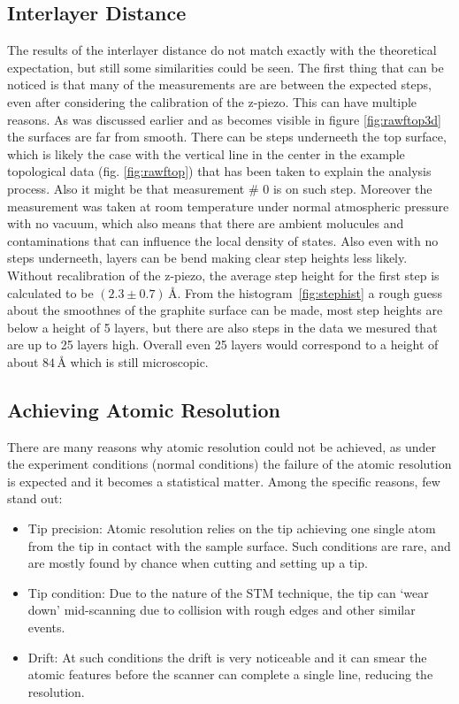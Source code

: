 \documentclass[a4paper]{article}
\begin{document}
\subsection{Interlayer Distance}

The results of the interlayer distance do not match exactly with the theoretical expectation, but still some similarities could be seen. The first thing that can be noticed is that many of the measurements are are between the expected steps, even after considering the calibration of the z-piezo. This can have multiple reasons. As was discussed earlier and as becomes visible in figure \ref{fig:rawftop3d} the surfaces are far from smooth. There can be steps underneeth the top surface, which is likely the case with the vertical line in the center in the example topological data (fig. \ref{fig:rawftop}) that has been taken to explain the analysis process. Also it might be that measurement \# 0 is on such step. Moreover the measurement was taken at room temperature under normal atmospheric pressure with no vacuum, which also means that there are ambient molucules and contaminations that can influence the local density of states. Also even with no steps underneeth, layers can be bend making clear step heights less likely.
Without recalibration of the z-piezo, the average step height for the first step is calculated to be $(2.3 \pm 0.7) \,\unit{\angstrom}$.
From the histogram~\ref{fig:stephist} a rough guess about the smoothnes of the graphite surface can be made, most step heights are below a height of 5 layers, but there are also steps in the data we mesured that are up to 25 layers high. Overall even 25 layers would correspond to a height of about $84 \,\unit{\angstrom}$ which is still microscopic.

\subsection{Achieving Atomic Resolution}
There are many reasons why atomic resolution could not be achieved, as under the experiment conditions (normal conditions) the failure of the atomic resolution is expected and it becomes a statistical matter. Among the specific reasons, few stand out:

\begin{itemize}
  \item Tip precision: Atomic resolution relies on the tip achieving one single atom from the tip in contact with the sample surface. Such conditions are rare, and are mostly found by chance when cutting and setting up a tip.
  \item Tip condition: Due to the nature of the STM technique, the tip can `wear down' mid-scanning due to collision with rough edges and other similar events.
  \item Drift: At such conditions the drift is very noticeable and it can smear the atomic features before the scanner can complete a single line, reducing the resolution.
\end{itemize}
\end{document}
